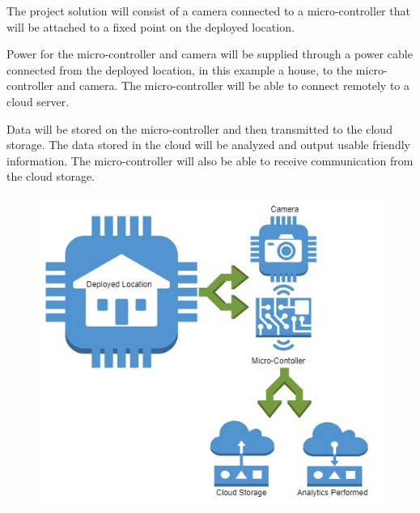 The project solution will consist of a camera connected to a micro-controller that will be attached to a fixed point on the deployed location. 

Power for the micro-controller and camera will be supplied through a power cable connected from the deployed location, in this example a house, to the micro-controller and camera. The micro-controller will be able to connect remotely to a cloud server. 

Data will be stored on the micro-controller and then transmitted to the cloud storage. The data stored in the cloud will be analyzed and output usable friendly information. The micro-controller will also be able to receive communication from the cloud storage.
\begin{figure}[h!]
	\centering
   	\includegraphics[width=1.1\textwidth]{images/System_Overview.jpg}
\end{figure}